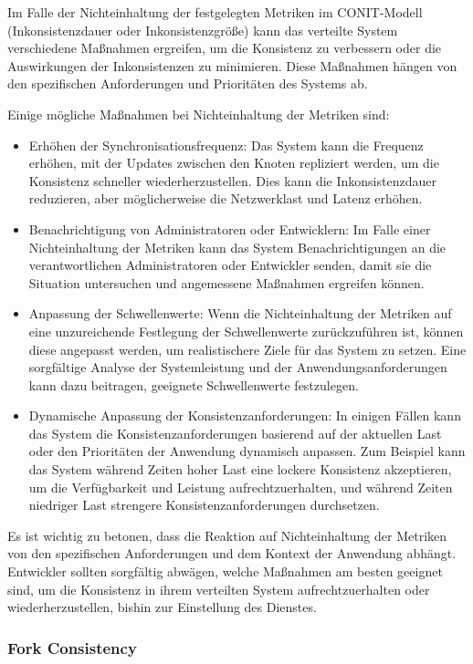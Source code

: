 \documentclass[../vs-script-first-v01.tex]{subfiles}
\begin{document}
Im Falle der Nichteinhaltung der festgelegten Metriken im CONIT-Modell (Inkonsistenzdauer oder Inkonsistenzgröße) kann das verteilte System verschiedene Maßnahmen ergreifen, um die Konsistenz zu verbessern oder die Auswirkungen der Inkonsistenzen zu minimieren. Diese Maßnahmen hängen von den spezifischen Anforderungen und Prioritäten des Systems ab.

Einige mögliche Maßnahmen bei Nichteinhaltung der Metriken sind:
\begin{itemize}
\item Erhöhen der Synchronisationsfrequenz: Das System kann die Frequenz erhöhen, mit der Updates zwischen den Knoten repliziert werden, um die Konsistenz schneller wiederherzustellen. Dies kann die Inkonsistenzdauer reduzieren, aber möglicherweise die Netzwerklast und Latenz erhöhen.
\item Benachrichtigung von Administratoren oder Entwicklern: Im Falle einer Nichteinhaltung der Metriken kann das System Benachrichtigungen an die verantwortlichen Administratoren oder Entwickler senden, damit sie die Situation untersuchen und angemessene Maßnahmen ergreifen können.
\item Anpassung der Schwellenwerte: Wenn die Nichteinhaltung der Metriken auf eine unzureichende Festlegung der Schwellenwerte zurückzuführen ist, können diese angepasst werden, um realistischere Ziele für das System zu setzen. Eine sorgfältige Analyse der Systemleistung und der Anwendungsanforderungen kann dazu beitragen, geeignete Schwellenwerte festzulegen.
\item Dynamische Anpassung der Konsistenzanforderungen: In einigen Fällen kann das System die Konsistenzanforderungen basierend auf der aktuellen Last oder den Prioritäten der Anwendung dynamisch anpassen. Zum Beispiel kann das System während Zeiten hoher Last eine lockere Konsistenz akzeptieren, um die Verfügbarkeit und Leistung aufrechtzuerhalten, und während Zeiten niedriger Last strengere Konsistenzanforderungen durchsetzen.
\end{itemize}
Es ist wichtig zu betonen, dass die Reaktion auf Nichteinhaltung der Metriken von den spezifischen Anforderungen und dem Kontext der Anwendung abhängt. Entwickler sollten sorgfältig abwägen, welche Maßnahmen am besten geeignet sind, um die Konsistenz in ihrem verteilten System aufrechtzuerhalten oder wiederherzustellen, bishin zur Einstellung des Dienstes. 




\subsubsection{Fork Consistency}
\end{document}
